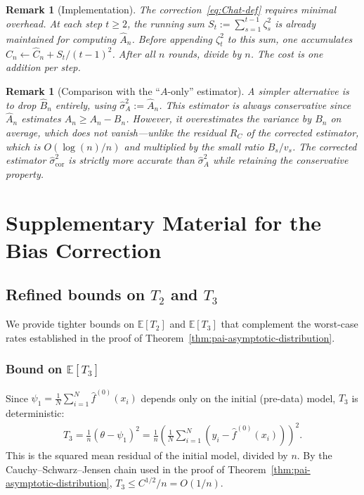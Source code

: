 \documentclass[11pt]{article}
\newtheorem{remark}[theorem]{Remark}
\newcommand{\fhat}{\hat{f}}
\newcommand{\sigmahat}{\hat{\sigma}}
\newcommand{\Bhat}{\hat{B}}
\newcommand{\Ahat}{\hat{A}}
\newcommand{\Chat}{\hat{C}}
\begin{document}
\begin{remark}[Implementation]
\label{rmk:implementation}
    The correction~\eqref{eq:Chat-def} requires minimal overhead. At each step $t \geq 2$, the running sum $S_t := \sum_{s=1}^{t-1}\zeta_s^2$ is already maintained for computing $\Ahat_n$. Before appending $\zeta_t^2$ to this sum, one accumulates $\Chat_n \leftarrow \Chat_n + S_t / (t-1)^2$. After all $n$ rounds, divide by $n$. The cost is one addition per step.
\end{remark}

\begin{remark}[Comparison with the ``$A$-only'' estimator]
\label{rmk:A-only}
    A simpler alternative is to drop $\Bhat_n$ entirely, using $\sigmahat_{A}^2 := \Ahat_n$. This estimator is always conservative since $\Ahat_n$ estimates $A_n \geq A_n - B_n$. However, it overestimates the variance by $B_n$ on average, which does not vanish---unlike the residual $R_C$ of the corrected estimator, which is $O(\log(n)/n)$ and multiplied by the small ratio $B_s/v_s$. The corrected estimator $\sigmahat_{\mathrm{cor}}^2$ is strictly more accurate than $\sigmahat_A^2$ while retaining the conservative property.
\end{remark}


\clearpage
\appendix

\section{Supplementary Material for the Bias Correction}

\subsection{Refined bounds on $T_2$ and $T_3$}
\label{app:T2-T3-bounds}

We provide tighter bounds on $\mathbb{E}[T_2]$ and $\mathbb{E}[T_3]$ that complement the worst-case rates established in the proof of Theorem~\ref{thm:pai-asymptotic-distribution}.

\subsubsection*{Bound on $\mathbb{E}[T_3]$}

Since $\psi_1 = \frac{1}{N}\sum_{i=1}^N \fhat^{(0)}(x_i)$ depends only on the initial (pre-data) model, $T_3$ is deterministic:
\begin{align*}
    T_3 = \frac{1}{n}\left(\theta - \psi_1\right)^2 = \frac{1}{n}\left(\frac{1}{N}\sum_{i=1}^N \left(y_i - \fhat^{(0)}(x_i)\right)\right)^2.
\end{align*}
This is the squared mean residual of the initial model, divided by $n$. By the Cauchy--Schwarz--Jensen chain used in the proof of Theorem~\ref{thm:pai-asymptotic-distribution}, $T_3 \leq C^{1/2}/n = O(1/n)$.
\end{document}
